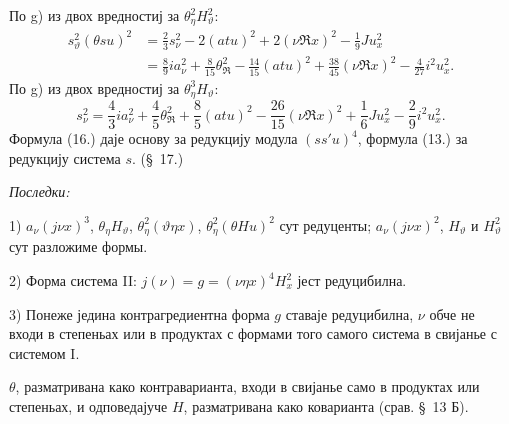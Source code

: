 ﻿\documentclass[11pt]{article}
\newcommand{\R}{\mathfrak R}
\begin{document}
\endgroup
По \mbox{g)} из двох вредностиј за $\theta_\eta^2H_\vartheta^2$:
\[
\tag{15}
\begin{aligned}
s_\vartheta^2(\theta su)^2
&=\frac23s_\nu^2-2(atu)^2+2(\nu\R x)^2-\frac19Ju_x^2\\
&=\frac89ia_\nu^2+\frac8{15}\theta_\R^2-\frac{14}{15}(atu)^2+\frac{38}{45}(\nu\R x)^2-\frac4{27}i^2u_x^2.
\end{aligned}
\]
По \mbox{g)} из двох вредностиј за $\theta_\eta^3H_\vartheta$:
\[
\tag{16}
s_\nu^2=\frac43ia_\nu^2+\frac45\theta_\R^2+\frac85(atu)^2-\frac{26}{15}(\nu\R x)^2+\frac16Ju_x^2-\frac29i^2u_x^2.
\]
Формула (16.) даје основу за редукцију модула $(ss'u)^4$, формула (13.) за редукцију система $s$. (\S\ 17.)

\noindent\textit{Последки:}

1) $a_\nu(j\nu x)^3$, $\theta_\eta H_\vartheta$, $\theta_\eta^2(\vartheta\eta x)$, $\theta_\eta^2(\theta Hu)^2$ сут редуценты; $a_\nu(j\nu x)^2$, $H_\vartheta$ и $H_\vartheta^2$ сут разложиме формы.

2) Форма система II: $j(\nu)=g=(\nu\eta x)^4H_x^2$ јест редуцибилна.

3) Понеже једина контрагредиентна форма $g$ ставаје редуцибилна, $\nu$ обче не входи в степеньах или в продуктах с формами того самого система в свијанье с системом I.

$\theta$, разматривана како контраварианта, входи в свијанье само в продуктах или степеньах, и одповедајуче $H$, разматривана како коварианта (срав. \S\ 13 Б).
\end{document}
